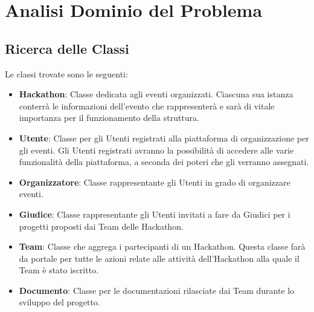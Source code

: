 \documentclass[a4paper, 15pt, oneside]{article}
\begin{document}
	\section{Analisi Dominio del Problema}
	\subsection{Ricerca delle Classi}
	Le classi trovate sono le seguenti:
	\begin{itemize}
		\item \textbf{Hackathon}: Classe dedicata agli eventi organizzati. Ciascuna sua istanza conterrà le informazioni dell'evento che rappresenterà e sarà di vitale importanza per il funzionamento della struttura.
		\item \textbf{Utente}: Classe per gli Utenti registrati alla piattaforma di organizzazione per gli eventi. Gli Utenti registrati avranno la possibilità di accedere alle varie funzionalità della piattaforma, a seconda dei poteri che gli verranno assegnati.
		\item \textbf{Organizzatore}: Classe rappresentante gli Utenti in grado di organizzare eventi.
		\item \textbf{Giudice}: Classe rappresentante gli Utenti invitati a fare da Giudici per i progetti proposti dai Team delle Hackathon.
		\item \textbf{Team}: Classe che aggrega i partecipanti di un Hackathon. Questa classe farà da portale per tutte le azioni relate alle attività dell'Hackathon alla quale il Team è stato iscritto.
		\item \textbf{Documento}:  Classe per le documentazioni rilasciate dai Team durante lo sviluppo del progetto.
	\end{itemize}
	\newpage
\end{document}
